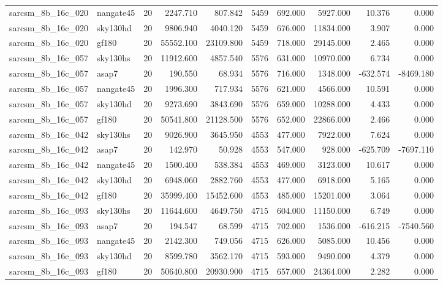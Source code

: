\documentclass{article}
\begin{document}
\begin{longtable}{llrrrrrrrr}
sarcsm\_8b\_16c\_020 & nangate45 & 20 & 2247.710 & 807.842 & 5459 & 692.000 & 5927.000 & 10.376 & 0.000 \\
sarcsm\_8b\_16c\_020 & sky130hd & 20 & 9806.940 & 4040.120 & 5459 & 676.000 & 11834.000 & 3.907 & 0.000 \\
sarcsm\_8b\_16c\_020 & gf180 & 20 & 55552.100 & 23109.800 & 5459 & 718.000 & 29145.000 & 2.465 & 0.000 \\
sarcsm\_8b\_16c\_057 & sky130hs & 20 & 11912.600 & 4857.540 & 5576 & 631.000 & 10970.000 & 6.734 & 0.000 \\
sarcsm\_8b\_16c\_057 & asap7 & 20 & 190.550 & 68.934 & 5576 & 716.000 & 1348.000 & -632.574 & -8469.180 \\
sarcsm\_8b\_16c\_057 & nangate45 & 20 & 1996.300 & 717.934 & 5576 & 621.000 & 4566.000 & 10.591 & 0.000 \\
sarcsm\_8b\_16c\_057 & sky130hd & 20 & 9273.690 & 3843.690 & 5576 & 659.000 & 10288.000 & 4.433 & 0.000 \\
sarcsm\_8b\_16c\_057 & gf180 & 20 & 50541.800 & 21128.500 & 5576 & 652.000 & 22866.000 & 2.466 & 0.000 \\
sarcsm\_8b\_16c\_042 & sky130hs & 20 & 9026.900 & 3645.950 & 4553 & 477.000 & 7922.000 & 7.624 & 0.000 \\
sarcsm\_8b\_16c\_042 & asap7 & 20 & 142.970 & 50.928 & 4553 & 547.000 & 928.000 & -625.709 & -7697.110 \\
sarcsm\_8b\_16c\_042 & nangate45 & 20 & 1500.400 & 538.384 & 4553 & 469.000 & 3123.000 & 10.617 & 0.000 \\
sarcsm\_8b\_16c\_042 & sky130hd & 20 & 6948.060 & 2882.760 & 4553 & 477.000 & 6918.000 & 5.165 & 0.000 \\
sarcsm\_8b\_16c\_042 & gf180 & 20 & 35999.400 & 15452.600 & 4553 & 485.000 & 15201.000 & 3.064 & 0.000 \\
sarcsm\_8b\_16c\_093 & sky130hs & 20 & 11644.600 & 4649.750 & 4715 & 604.000 & 11150.000 & 6.749 & 0.000 \\
sarcsm\_8b\_16c\_093 & asap7 & 20 & 194.547 & 68.599 & 4715 & 702.000 & 1536.000 & -616.215 & -7540.560 \\
sarcsm\_8b\_16c\_093 & nangate45 & 20 & 2142.300 & 749.056 & 4715 & 626.000 & 5085.000 & 10.456 & 0.000 \\
sarcsm\_8b\_16c\_093 & sky130hd & 20 & 8599.780 & 3562.170 & 4715 & 593.000 & 9490.000 & 4.379 & 0.000 \\
sarcsm\_8b\_16c\_093 & gf180 & 20 & 50640.800 & 20930.900 & 4715 & 657.000 & 24364.000 & 2.282 & 0.000 \\

\end{longtable}
\end{document}
